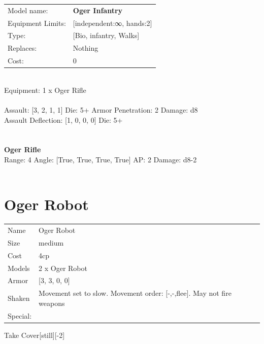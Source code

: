 \noindent
\begin{tabular}{ll}
Model name: &{\bf Oger Infantry } \\
Equipment Limits: &[independent:∞, hands:2] \\
Type: &[Bio, infantry, Walks] \\
Replaces: &Nothing \\
Cost: & 0\\
\end{tabular}
\ \\
Equipment: 1 x Oger Rifle \\
\ \\
Assault: [3, 2, 1, 1] Die: 5+ Armor Penetration: 2 Damage: d8 \\
Assault Deflection: [1, 0, 0, 0] Die: 5+\\
\indent  
\ \\

\ \\
{\bf Oger Rifle } \\



Range: 4  Angle: [True, True, True, True] AP: 2 Damage: d8-2 \\




 
\ \\













\clearpage

\section{ Oger Robot }

\begin{tabular}{ll}
  Name & Oger Robot \\
  Size & medium\\
  Cost & 4cp\\
  Models & 2 x Oger Robot\\
  Armor & [3, 3, 0, 0]\\
  Shaken & Movement set to slow. Movement order: [-,-,flee]. May not fire weapons\\
  Special: \\
\end{tabular}

\noindent Take Cover[still][-2]\\ 


